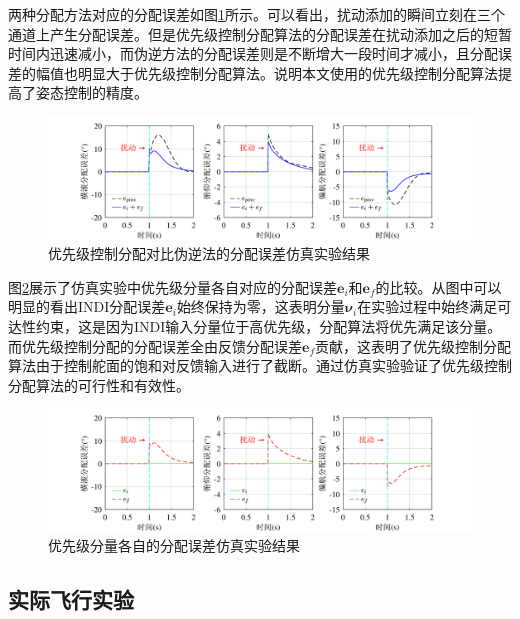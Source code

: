 两种分配方法对应的分配误差如图\ref{优先级伪逆分配误差仿真}所示。可以看出，扰动添加的瞬间立刻在三个通道上产生分配误差。但是优先级控制分配算法的分配误差在扰动添加之后的短暂时间内迅速减小，而伪逆方法的分配误差则是不断增大一段时间才减小，且分配误差的幅值也明显大于优先级控制分配算法。说明本文使用的优先级控制分配算法提高了姿态控制的精度。
\begin{figure}[htbp]
	\centering
	\begin{minipage}[c]{1\textwidth}
        \centering
        \includegraphics[scale=1]{Fig/优先级对比伪逆的分配误差仿真实验结果.pdf}
        \caption{\label{优先级伪逆分配误差仿真}优先级控制分配对比伪逆法的分配误差仿真实验结果}
        \end{minipage}
\end{figure}

图\ref{优先级分量分配误差仿真}展示了仿真实验中优先级分量各自对应的分配误差$\boldsymbol{e}_i$和$\boldsymbol{e}_f$的比较。从图中可以明显的看出INDI分配误差$\boldsymbol{e}_i$始终保持为零，这表明分量$\boldsymbol{\nu}_i$在实验过程中始终满足可达性约束，这是因为INDI输入分量位于高优先级，分配算法将优先满足该分量。而优先级控制分配的分配误差全由反馈分配误差$\boldsymbol{e}_f$贡献，这表明了优先级控制分配算法由于控制舵面的饱和对反馈输入进行了截断。通过仿真实验验证了优先级控制分配算法的可行性和有效性。
\begin{figure}[htbp]
	\centering
	\begin{minipage}[c]{1\textwidth}
        \centering
        \includegraphics[scale=1]{Fig/优先级各分量的分配误差仿真实验结果.pdf}
        \caption{\label{优先级分量分配误差仿真}优先级分量各自的分配误差仿真实验结果}
        \end{minipage}
\end{figure}
\subsection{实际飞行实验}

